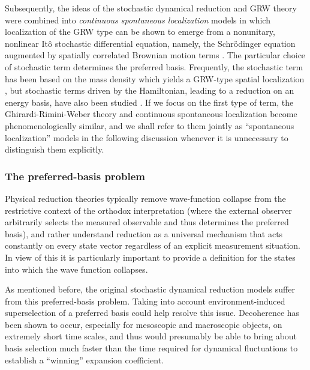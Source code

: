 \documentclass[rmp,aps,amsmath,amsfonts,noshowkeys,noshowpacs,12pt]{revtex4}
\begin{document}
Subsequently, the ideas of the stochastic dynamical reduction and GRW
theory were combined into {\em continuous spontaneous localization}
models \cite{Pearle:1989:cs,Ghirardi:1990:lm} in which localization of
the GRW type can be shown to emerge from a nonunitary, nonlinear It\^o
stochastic differential equation, namely, the Schr\"odinger equation
augmented by spatially correlated Brownian motion terms \citep[see
also][]{Diosi:1988:wx,Diosi:1989:yb}. The particular choice of 
stochastic term determines the preferred basis. Frequently, the
stochastic term has been based on the mass density which yields a
GRW-type spatial localization
\citep{Diosi:1989:yb,Pearle:1989:cs,Ghirardi:1990:lm}, but stochastic
terms driven by the Hamiltonian, leading to a reduction on an energy
basis, have also been studied
\citep{Bedford:1975:un,Bedford:1977:un,Milburn:1991:tv,Percival:1995:om,%
Percival:1998:om,Hughston:1996:in,Fivel:1997:ia,%
Adler:2002:rc,Adler:2001:tr,Adler:2000:gv}.  If we focus on the first
type of term, the Ghirardi-Rimini-Weber theory and continuous
spontaneous localization become phenomenologically similar, and we
shall refer to them jointly as ``spontaneous localization'' models in
the following discussion whenever it is unnecessary to distinguish
them explicitly.


\subsubsection{The preferred-basis problem}
  
Physical reduction theories typically remove wave-function collapse
from the restrictive context of the orthodox interpretation (where the
external observer arbitrarily selects the measured observable and thus
determines the preferred basis), and rather understand reduction as a
universal mechanism that acts constantly on every state vector
regardless of an explicit measurement situation. In view of this it is
particularly important to provide a definition for the states into
which the wave function collapses.

As mentioned before, the original stochastic dynamical reduction
models suffer from this preferred-basis problem. Taking into account
environment-induced superselection of a preferred basis could help
resolve this issue.  Decoherence has been shown to occur, especially
for mesoscopic and macroscopic objects, on extremely short time
scales, and thus would presumably be able to bring about basis
selection much faster than the time required for dynamical
fluctuations to establish a ``winning'' expansion coefficient.
\end{document}
